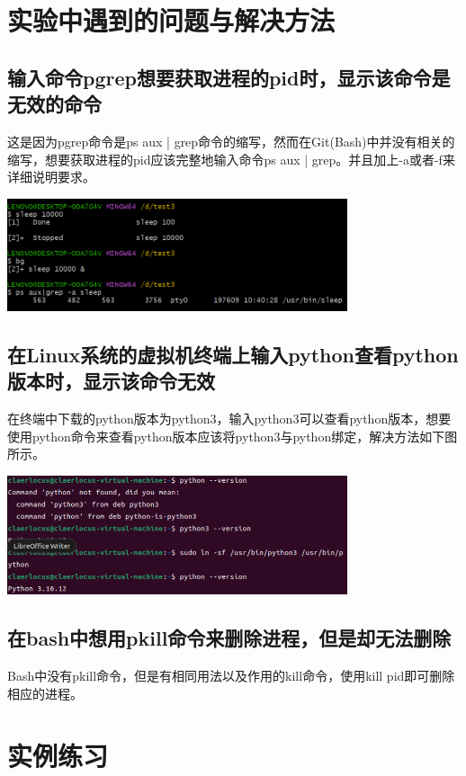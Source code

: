 \documentclass[UTF8,a4paper]{ctexart}
\begin{document}
\begin{sloppypar}
	
	\section{实验中遇到的问题与解决方法}
	\subsection{输入命令pgrep想要获取进程的pid时，显示该命令是无效的命令}

	这是因为pgrep命令是ps aux | grep命令的缩写，然而在Git(Bash)中并没有相关的缩写，想要获取进程的pid应该完整地输入命令ps aux | grep。并且加上-a或者-f来详细说明要求。
	
	\includegraphics[width = 10cm]{1}
	
	\subsection{在Linux系统的虚拟机终端上输入python查看python版本时，显示该命令无效}
	
	在终端中下载的python版本为python3，输入python3可以查看python版本，想要使用python命令来查看python版本应该将python3与python绑定，解决方法如下图所示。
	
	\includegraphics[width = 10cm]{11}

	\subsection{在bash中想用pkill命令来删除进程，但是却无法删除}
	
	Bash中没有pkill命令，但是有相同用法以及作用的kill命令，使用kill pid即可删除相应的进程。
	
	\section{实例练习}

\end{sloppypar}
\end{document}
